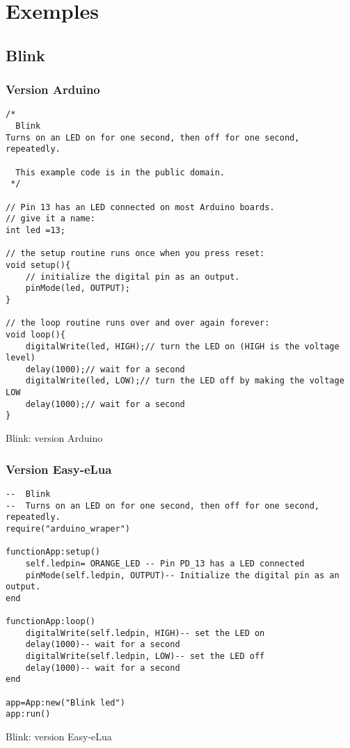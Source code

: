 \chapter[Exemples]{Exemples} 

\section{Blink}

\subsection{Version Arduino}

\begin{table}[h]
\begin{lstlisting}
/*
  Blink
Turns on an LED on for one second, then off for one second, repeatedly.

  This example code is in the public domain.
 */

// Pin 13 has an LED connected on most Arduino boards.
// give it a name:
int led =13;

// the setup routine runs once when you press reset:
void setup(){
    // initialize the digital pin as an output.
    pinMode(led, OUTPUT);
}

// the loop routine runs over and over again forever:
void loop(){
    digitalWrite(led, HIGH);// turn the LED on (HIGH is the voltage level)
    delay(1000);// wait for a second
    digitalWrite(led, LOW);// turn the LED off by making the voltage LOW
    delay(1000);// wait for a second
}
\end{lstlisting}
\caption{Blink: version Arduino}
\end{table}

\subsection{Version Easy-eLua}

\begin{table}[h]
\begin{lstlisting}
--  Blink
--  Turns on an LED on for one second, then off for one second, repeatedly.
require("arduino_wraper")

functionApp:setup()
    self.ledpin= ORANGE_LED -- Pin PD_13 has a LED connected
    pinMode(self.ledpin, OUTPUT)-- Initialize the digital pin as an output.
end

functionApp:loop()
    digitalWrite(self.ledpin, HIGH)-- set the LED on
    delay(1000)-- wait for a second
    digitalWrite(self.ledpin, LOW)-- set the LED off
    delay(1000)-- wait for a second
end

app=App:new("Blink led")
app:run()
\end{lstlisting}
\caption{Blink: version Easy-eLua}
\end{table}


